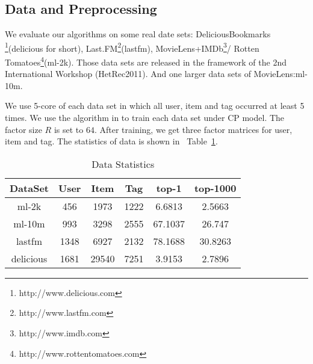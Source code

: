 \documentclass[letterpaper]{article}
\newcommand{\Table}[1] {Table~\ref{table:#1}}
\begin{document}
\subsection{Data and Preprocessing}
We evaluate our algorithms on some real date sets:
DeliciousBookmarks
\footnote{http://www.delicious.com}(delicious for short),
Last.FM\footnote{http://www.lastfm.com}(lastfm),
MovieLens+IMDb\footnote{http://www.imdb.com }/
Rotten Tomatoes\footnote{http://www.rottentomatoes.com}(ml-2k).
Those data sets are released in the framework of the 2nd International Workshop (HetRec2011).
And one larger data sets of MovieLens\cite{Harper2015}:ml-10m.

We use 5-core of each data set in which all user, item and tag occurred at least 5 times.
We use the algorithm in \cite{Rendle_RTF} to train each data set under CP model.
The factor size $R$ is set to $64$.
After training, we get three factor matrices for user, item and tag.
The statistics of data is shown in ~\Table{Data}.
\begin{table}[t]
  \centering
  \begin{tabular}{|c|c|c|c|c|c|}
    \hline
    DataSet     & User & Item    & Tag    & top-1   & top-1000\\
    \hline
    ml-2k       & 456  &  1973   &  1222  & 6.6813  & 2.5663 \\
    ml-10m      & 993  &  3298   &  2555  & 67.1037 & 26.747 \\
    lastfm      & 1348 &  6927   &  2132  & 78.1688 & 30.8263\\
    delicious   & 1681 &  29540  &  7251  & 3.9153  & 2.7896 \\
    \hline
  \end{tabular}
  \caption{Data Statistics}
  \label{table:Data}
\end{table}
\end{document}
